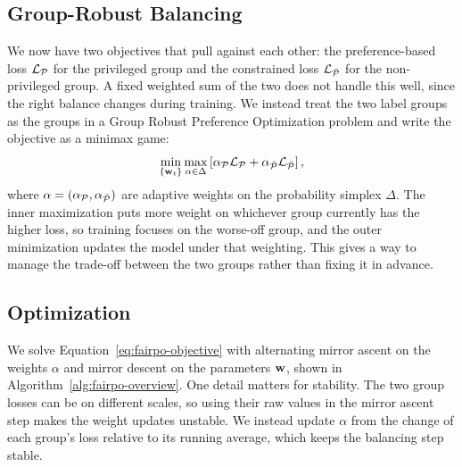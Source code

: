 \subsection{Group-Robust Balancing}
\label{subsec:fairpo-grpo}

We now have two objectives that pull against each other: the preference-based loss
$\mathcal{L}_{\mathcal{P}}$ for the privileged group and the constrained loss
$\mathcal{L}_{\bar{\mathcal{P}}}$ for the non-privileged group. A fixed weighted sum of the
two does not handle this well, since the right balance changes during training. We
instead treat the two label groups as the groups in a Group Robust Preference
Optimization problem \citep{ramesh2024group} and write the objective as a minimax
game:
\begin{equation}
	\min_{\{\mathbf{w}_t\}} \max_{\alpha \in \Delta} \left[ \alpha_{\mathcal{P}} \mathcal{L}_{\mathcal{P}} + \alpha_{\bar{\mathcal{P}}} \mathcal{L}_{\bar{\mathcal{P}}} \right],
	\label{eq:fairpo-objective}
\end{equation}
where $\alpha = (\alpha_{\mathcal{P}}, \alpha_{\bar{\mathcal{P}}})$ are adaptive
weights on the probability simplex $\Delta$. The inner maximization puts more
weight on whichever group currently has the higher loss, so training focuses on the
worse-off group, and the outer minimization updates the model under that weighting.
This gives a way to manage the trade-off between the two groups rather than fixing
it in advance.

\subsection{Optimization}
\label{subsec:fairpo-optim}

We solve Equation~\ref{eq:fairpo-objective} with alternating mirror ascent on the
weights $\alpha$ and mirror descent on the parameters $\mathbf{w}$, shown in
Algorithm~\ref{alg:fairpo-overview}. One detail matters for stability. The two
group losses can be on different scales, so using their raw values in the mirror
ascent step makes the weight updates unstable. We instead update $\alpha$ from the
change of each group's loss relative to its running average, which keeps the
balancing step stable.

